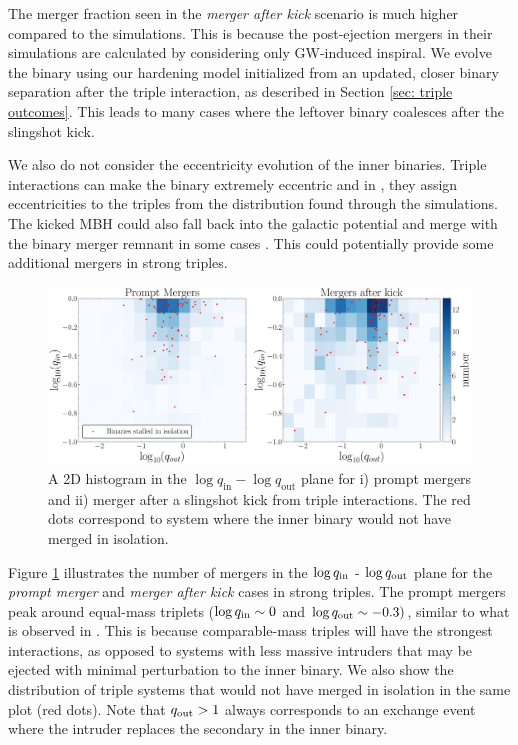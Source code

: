 \documentclass[11pt, letterpaper]{article}
\begin{document}
The merger fraction seen in the \emph{merger after kick} scenario is much higher compared to the \cite{bonetti_post-newtonian_2018} simulations. This is because the post-ejection mergers in their simulations are calculated by considering only GW-induced inspiral. We evolve the binary using our hardening model initialized from an updated, closer binary separation after the triple interaction, as described in Section \ref{sec: triple outcomes}. This leads to many cases where the leftover binary coalesces after the slingshot kick. 


We also do not consider the eccentricity evolution of the inner binaries. Triple interactions can make the binary extremely eccentric and in \cite{bonetti_post-newtonian_2019}, they assign eccentricities to the triples from the distribution found through the simulations. The kicked MBH could also fall back into the galactic potential and merge with the binary merger remnant in some cases \citep{hoffman_dynamics_2007}. This could potentially provide some additional mergers in strong triples.

\begin{figure}[!htb] 
    \centering
    \includegraphics[scale=0.4]{fig/2d-hist-qin-qout-for-mergers.pdf}
    \caption{A 2D histogram in the $\log q_{\text{in}} - \log q_{\text{out}}$ plane for i) prompt mergers and ii) merger after a slingshot kick from triple interactions. The red dots correspond to system where the inner binary would not have merged in isolation.}
    \label{fig:2d-hist-qin-qout}
\end{figure}


Figure \ref{fig:2d-hist-qin-qout} illustrates the number of mergers in the $\log q_{\rm in}$ - $\log q_{\rm out}$ plane for the \emph{prompt merger} and \emph{merger after kick} cases in strong triples. The prompt mergers peak around equal-mass triplets ($\log q_{\rm in} \sim 0$ and $\log q_{\rm out} \sim -0.3) $, similar to what is observed in \citet{bonetti_post-newtonian_2018}. This is because comparable-mass triples will have the strongest interactions, as opposed to systems with less massive intruders that may be ejected with minimal perturbation to the inner binary. We also show the distribution of triple systems that would not have merged in isolation in the same plot (red dots). Note that $q_{\rm out} > 1$ always corresponds to an exchange event where the intruder replaces the secondary in the inner binary.
\end{document}
